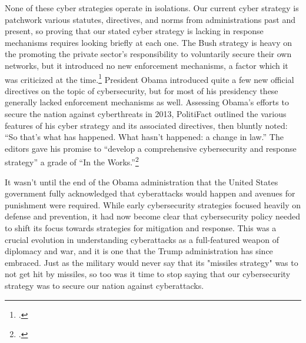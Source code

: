 \documentclass{report}
\begin{document}
\begin{refsegment}
None of these cyber strategies operate in isolations. Our current cyber strategy is patchwork various statutes, directives, and norms from administrations past and present, so proving that our stated cyber strategy is lacking in response mechanisms requires looking briefly at each one. The Bush strategy is heavy on the promoting the private sector's responsibility to voluntarily secure their own networks, but it introduced no new enforcement mechanisms, a factor which it was criticized at the time.\footcite{lemos_bush_2003} President Obama introduced quite a few new official directives on the topic of cybersecurity, but for most of his presidency these generally lacked enforcement mechanisms as well. Assessing Obama's efforts to secure the nation against cyberthreats in 2013, PolitiFact outlined the various features of his cyber strategy and its associated directives, then bluntly noted: ``So that's what has happened. What hasn't happened: a change in law.'' The editors gave his promise to ``develop a comprehensive cybersecurity and response strategy'' a grade of ``In the Works.''\footcite{moorhead_work_2013}

It wasn't until the end of the Obama administration that the United States government fully acknowledged that  cyberattacks would happen and avenues for punishment were required. While early cybersecurity strategies focused heavily on defense and prevention, it had now become clear that cybersecurity policy needed to shift its focus towards strategies for mitigation and response. This was a crucial evolution in understanding cyberattacks as a full-featured weapon of diplomacy and war, and it is one that the Trump administration has since embraced. Just as the military would never say that its "missiles strategy" was to not get hit by missiles, so too was it time to stop saying that our cybersecurity strategy was to secure our nation against cyberattacks.


\end{refsegment}
\end{document}

